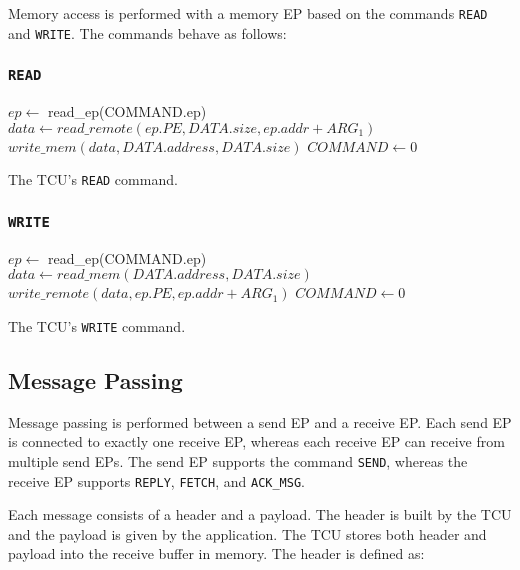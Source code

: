 \documentclass[a4paper,11pt,draft]{article}
\begin{document}
Memory access is performed with a memory EP based on the commands \texttt{READ} and \texttt{WRITE}. The commands behave as follows:

\subsubsection{\texttt{READ}}

\begin{algorithm}[H]
    $ep \gets$ read\_ep(COMMAND.ep)\;
    \BlankLine
    $data \gets read\_remote(ep.PE, DATA.size, ep.addr + ARG_1)$\;
    $write\_mem(data, DATA.address, DATA.size)$\;
    \BlankLine
    $COMMAND \gets 0$\;
    \caption{The TCU's \texttt{READ} command.}
\end{algorithm}

\subsubsection{\texttt{WRITE}}

\begin{algorithm}[H]
    $ep \gets$ read\_ep(COMMAND.ep)\;
    \BlankLine
    $data \gets read\_mem(DATA.address, DATA.size)$\;
    $write\_remote(data, ep.PE, ep.addr + ARG_1)$\;
    \BlankLine
    $COMMAND \gets 0$\;
    \caption{The TCU's \texttt{WRITE} command.}
\end{algorithm}

\subsection{Message Passing}

Message passing is performed between a send EP and a receive EP. Each send EP is connected to
exactly one receive EP, whereas each receive EP can receive from multiple send EPs. The send EP
supports the command \texttt{SEND}, whereas the receive EP supports \texttt{REPLY}, \texttt{FETCH},
and \texttt{ACK\_MSG}.

Each message consists of a header and a payload. The header is built by the TCU and the payload is
given by the application. The TCU stores both header and payload into the receive buffer in memory.
The header is defined as:
\end{document}
